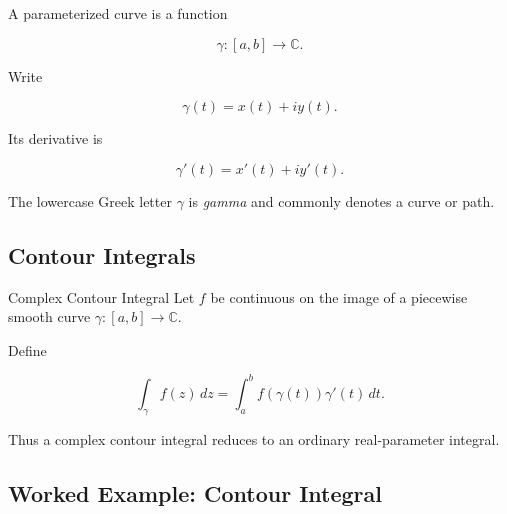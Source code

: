 A parameterized curve is a function

\[
\boxed{
\gamma:[a,b]\to\mathbb{C}.
}
\]

Write

\[
\gamma(t)
=
x(t)+iy(t).
\]

Its derivative is

\[
\boxed{
\gamma'(t)
=
x'(t)+iy'(t).
}
\]

The lowercase Greek letter \(\gamma\) is \emph{gamma} and commonly denotes
a curve or path.

\subsection{Contour Integrals}
\label{subsec:contour-integrals}

\begin{definitionbox}{Complex Contour Integral}
Let \(f\) be continuous on the image of a piecewise smooth curve
\(\gamma:[a,b]\to\mathbb{C}\).

Define

\[
\boxed{
\int_\gamma f(z)\,dz
=
\int_a^b
f(\gamma(t))\gamma'(t)\,dt.
}
\]
\end{definitionbox}

Thus a complex contour integral reduces to an ordinary real-parameter
integral.

\subsection{Worked Example: Contour Integral}
\label{subsec:worked-contour-integral}


